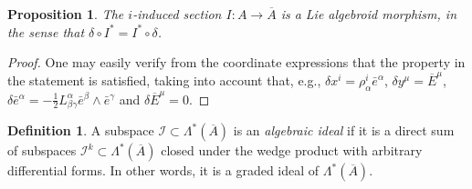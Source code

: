 \documentclass[11pt]{article}
\theoremstyle{plain}
\newtheorem{proposition}{Proposition}
\theoremstyle{definition}
\newtheorem{definition}{Definition}
\begin{document}
\begin{proposition}
The $i$-induced section $I\colon A \to \overline A$ is a Lie algebroid morphism, in the sense that $\delta\circ I^* = I^* \circ \delta$.
\end{proposition}
\begin{proof}


One may easily verify from the coordinate expressions that the property in the statement is satisfied, taking into account that, e.g., ${\delta} x^i=\rho_{\alpha}^i\bar{e}^{\alpha}$, $\delta y^\mu={\overline E}^\mu$,   ${\delta} \bar{e}^{\alpha}=-\frac{1}{2}L_{\beta \gamma}^{\alpha}\bar{e}^{\beta}\wedge \bar{e}^{\gamma}$ and ${\delta} \overline{E}^{\mu}=0$.
\end{proof}


\begin{definition}
A subspace $\mathcal{I}\subset \Lambda^{\ast}(\overline{A})$ is an \emph{algebraic ideal} if it is a direct sum of subspaces $\mathcal{I}^k\subset \Lambda^{\ast}(\overline{A})$ closed under the wedge product with arbitrary differential forms. In other words, it is a graded ideal of $\Lambda^{\ast}(\overline{A})$.
\end{definition}
\end{document}
